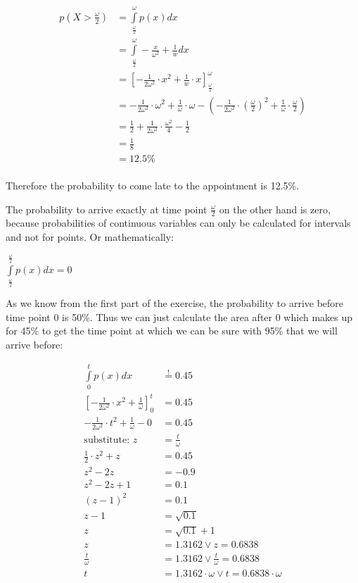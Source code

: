 \begin{align*}
  p\left(X > \frac{\omega}{2}\right) &= \int\limits_{\frac{\omega}{2}}^{\omega} p(x) dx \\
  &= \int\limits_{\frac{\omega}{2}}^{\omega} -\frac{x}{\omega^2} + \frac{1}{w} dx \\
  &= \left[-\frac{1}{2\omega^2}\cdot x^2 + \frac{1}{w}\cdot x\right]_{\frac{\omega}{2}}^{\omega} \\
  &= -\frac{1}{2\omega^2}\cdot \omega^2 + \frac{1}{\omega}\cdot \omega - \left(-\frac{1}{2\omega^2}\cdot \left(\frac{\omega}{2}\right)^2 + \frac{1}{\omega}\cdot \frac{\omega}{2}\right) \\
  &= \frac{1}{2} + \frac{1}{2\omega^2}\cdot\frac{\omega^2}{4} - \frac{1}{2}\\
  &= \frac{1}{8}\\
  &= 12.5\% \\
\end{align*}

Therefore the probability to come late to the appointment is 12.5\%.

The probability to arrive exactly at time point $\frac{\omega}{2}$ on the other hand is zero, because probabilities of continuous variables can only be calculated for intervals and not for points. Or mathematically:

$\int\limits_{\frac{\omega}{2}}^{\frac{\omega}{2}} p(x)dx = 0$

As we know from the first part of the exercise, the probability to arrive before time point 0 is 50\%. Thus we can just calculate the area after 0 which makes up for 45\% to get the time point at which we can be sure with 95\%  that we will arrive before:

\begin{align*}
  \int\limits_{0}^{t} p(x)dx &\stackrel{!}{=} 0.45\\
  \left[-\frac{1}{2\omega^2}\cdot x^2 + \frac{1}{\omega}\right]_0^t & = 0.45   \\
  -\frac{1}{2\omega^2}\cdot t^2 + \frac{1}{\omega} - 0 &= 0.45   \\
 \mbox{substitute: }z&=\frac{t}{\omega}\\
  \frac{1}{2}\cdot z^2 + z &= 0.45\\
  z^2 - 2z &= -0.9\\
  z^2 - 2z + 1 &= 0.1\\
  \left(z-1\right)^2 &= 0.1\\
  z-1 &= \sqrt{0.1}\\
  z &= \sqrt{0.1} + 1\\
  z &= 1.3162 \vee  z = 0.6838\\
  \frac{t}{\omega} &= 1.3162 \vee  \frac{t}{\omega} = 0.6838\\
  t &= 1.3162\cdot \omega \vee t  = 0.6838\cdot \omega
\end{align*}

